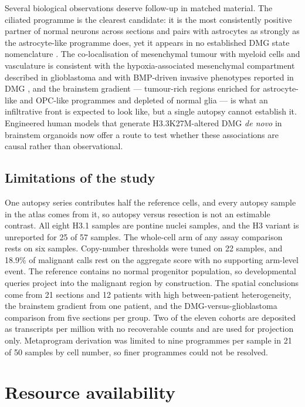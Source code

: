 \documentclass[12pt,a4paper]{article}
\begin{document}
Several biological observations deserve follow-up in matched material. The ciliated programme is the clearest
candidate: it is the most consistently positive partner of normal neurons across sections and pairs with astrocytes as
strongly as the astrocyte-like programme does, yet it appears in no established DMG state nomenclature
\citep{filbin2018developmental,jessa2022km,liu2022landscape}. The co-localisation of mesenchymal tumour with myeloid
cells and vasculature is consistent with the hypoxia-associated mesenchymal compartment described in glioblastoma
\citep{neftel2019integrative} and with BMP-driven invasive phenotypes reported in DMG \citep{huchede2024bmp}, and the
brainstem gradient --- tumour-rich regions enriched for astrocyte-like and OPC-like programmes and depleted of normal
glia --- is what an infiltrative front is expected to look like, but a single autopsy cannot establish it. Engineered
human models that generate H3.3K27M-altered DMG \textit{de novo} in brainstem organoids \citep{bessler2026de} now offer
a route to test whether these associations are causal rather than observational.

\subsection{Limitations of the study}

One autopsy series contributes half the reference cells, and every autopsy sample in the atlas comes from it, so
autopsy versus resection is not an estimable contrast. All eight H3.1 samples are pontine nuclei samples, and the H3
variant is unreported for 25 of 57 samples. The whole-cell arm of any assay comparison rests on six samples.
Copy-number thresholds were tuned on 22 samples, and 18.9\% of malignant calls rest on the aggregate score with no
supporting arm-level event. The reference contains no normal progenitor population, so developmental queries project
into the malignant region by construction. The spatial conclusions come from 21 sections and 12 patients with high
between-patient heterogeneity, the brainstem gradient from one patient, and the DMG-versus-glioblastoma comparison from
five sections per group. Two of the eleven cohorts are deposited as transcripts per million with no recoverable counts
and are used for projection only. Metaprogram derivation was limited to nine programmes per sample in 21 of 50 samples
by cell number, so finer programmes could not be resolved.

\section{Resource availability}
\end{document}
